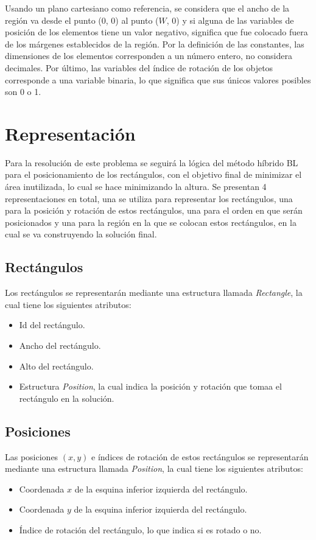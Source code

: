 \documentclass[letter, 10pt]{article}
\begin{document}
Usando un plano cartesiano como referencia, se considera que el ancho de la regi\'on va desde el punto (0, 0) al punto ($W$, 0) y si alguna de las variables de posici\'on de los elementos tiene un valor negativo, significa que fue colocado fuera de los m\'argenes establecidos de la regi\'on. Por la definici\'on de las constantes, las dimensiones de los elementos corresponden a un n\'umero entero, no considera decimales. Por \'ultimo, las variables del \'indice de rotaci\'on de los objetos corresponde a una variable binaria, lo que significa que sus \'unicos valores posibles son 0 o 1.

\section{Representaci\'on}

Para la resoluci\'on de este problema se seguir\'a la l\'ogica del m\'etodo h\'ibrido BL para el posicionamiento de los rect\'angulos, con el objetivo final de minimizar el \'area inutilizada, lo cual se hace minimizando la altura. Se presentan 4 representaciones en total, una se utiliza para representar los rect\'angulos, una para la posici\'on y rotaci\'on de estos rect\'angulos, una para el orden en que ser\'an posicionados y una para la regi\'on en la que se colocan estos rect\'angulos, en la cual se va construyendo la soluci\'on final.

\subsection{Rect\'angulos}
Los rect\'angulos se representar\'an mediante una estructura llamada \emph{Rectangle}, la cual tiene los siguientes atributos:
\begin{itemize}
    \item Id del rect\'angulo.
    \item Ancho del rect\'angulo.
    \item Alto del rect\'angulo.
    \item Estructura \emph{Position}, la cual indica la posici\'on y rotaci\'on que tomaa el rect\'angulo en la soluci\'on. 
\end{itemize}

\subsection{Posiciones}

Las posiciones $(x,y)$ e \'indices de rotaci\'on de estos rect\'angulos se representar\'an mediante una estructura llamada \emph{Position}, la cual tiene los siguientes atributos:
\begin{itemize}
    \item Coordenada $x$ de la esquina inferior izquierda del rect\'angulo.
    \item Coordenada $y$ de la esquina inferior izquierda del rect\'angulo.
    \item \'Indice de rotaci\'on del rect\'angulo, lo que indica si es rotado o no.
\end{itemize}
\end{document}
